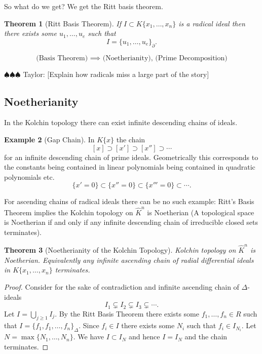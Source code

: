 \documentclass[12pt]{book}
\newcommand{\taylor}[1]{{\color{blue} \sf $\spadesuit\spadesuit\spadesuit$ Taylor: [#1]}}
\numberwithin{equation}{section}
\newtheorem{theorem}{Theorem}[subsection]
\theoremstyle{definition}
\newtheorem{example}[theorem]{Example}
\theoremstyle{remark}
\begin{document}
So what do we get?  We get the Ritt basis theorem.
\begin{theorem}[Ritt Basis Theorem]
	If $I \subset K\lbrace x_1,\ldots,x_n \rbrace$ is a radical ideal then there exists some $u_1,\ldots,u_e$ such that 
	 $$ I = \lbrace u_1,\ldots,u_e \rbrace_{\partial}.$$
\end{theorem}

$$ \mbox{ (Basis Theorem) $\implies$ (Noetherianity), (Prime Decomposition) }$$

\taylor{Explain how radicals miss a large part of the story}

\subsection{Noetherianity}
In the Kolchin topology there can exist infinite descending chains of ideals.
\begin{example}[Gap Chain]
In $K\lbrace x \rbrace$ the chain 
$$[x]\supset [x'] \supset [x''] \supset \cdots$$
for an infinite descending chain of prime ideals.
Geometrically this corresponds to the constants being contained in linear polynomials being contained in quadratic polynomials etc. 
 $$ \lbrace x' =0 \rbrace \subset \lbrace x'' =0 \rbrace \subset \lbrace x''' =0 \rbrace \subset \cdots. $$
\end{example}
For ascending chains of radical ideals there can be no such example: Ritt's Basis Theorem implies the Kolchin topology on $\widehat{K}^n$ is Noetherian (A topological space is Noetherian if and only if any infinite descending chain of irreducible closed sets terminates). 

\begin{theorem}[Noetherianity of the Kolchin Topology]
 Kolchin topology on $\widehat{K}^n$ is Noetherian. 
 Equivalently any infinite ascending chain of radial differential ideals in $K\lbrace x_1,\ldots, x_n\rbrace$ terminates.
\end{theorem}
\begin{proof}
	Consider for the sake of contradiction and infinite ascending chain of $\Delta$-ideals
	 $$I_1 \subsetneq I_2 \subsetneq I_3 \subsetneq \cdots. $$
	Let $I = \bigcup_{j \geq 1} I_j$.
	By the Ritt Basis Theorem there exists some $f_1,\ldots,f_n\in R$ such that $I = \lbrace f_1,f_1,\ldots,f_n\rbrace_{\Delta}$.
	Since $f_i \in I$ there exists some $N_i$ such that $f_i \in I_{N_i}$. 
	Let $N= \max\lbrace N_1,\ldots,N_n\rbrace$. 
	We have $I \subset I_N$ and hence $I=I_N$ and the chain terminates.
\end{proof}
\end{document}
